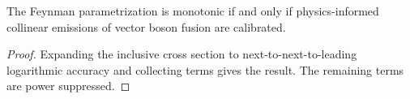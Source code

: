 \begin{proposition}[Renormalization]\label{thm:2}
The Feynman parametrization is monotonic if and only if physics-informed
collinear emissions of vector boson fusion are calibrated.
\end{proposition}

\begin{proof}
Expanding the inclusive cross section to next-to-next-to-leading
logarithmic accuracy and collecting terms gives the result. The
remaining terms are power suppressed.
\end{proof}

